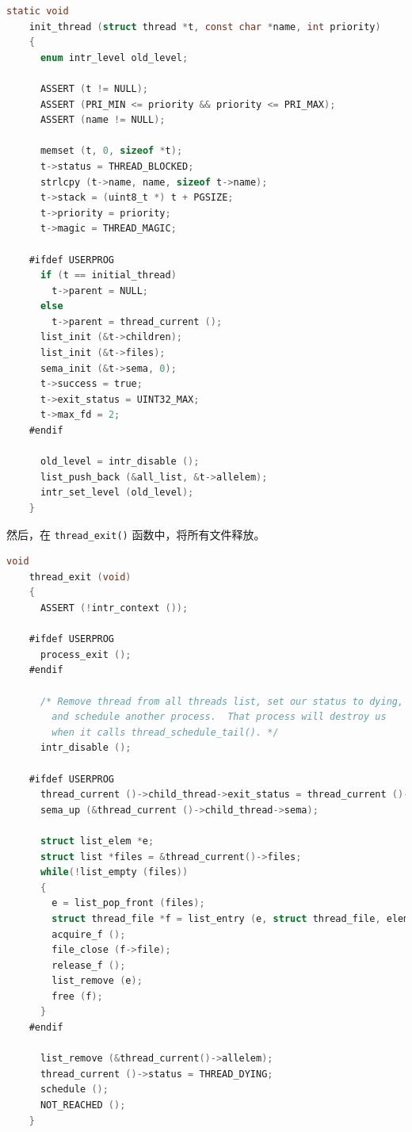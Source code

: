 \documentclass{article}
\begin{document}
\begin{lstlisting}[language=C, title=\texttt{src/threads/thread.c - init\_thread()}]
    static void
    init_thread (struct thread *t, const char *name, int priority)
    {
      enum intr_level old_level;
    
      ASSERT (t != NULL);
      ASSERT (PRI_MIN <= priority && priority <= PRI_MAX);
      ASSERT (name != NULL);
    
      memset (t, 0, sizeof *t);
      t->status = THREAD_BLOCKED;
      strlcpy (t->name, name, sizeof t->name);
      t->stack = (uint8_t *) t + PGSIZE;
      t->priority = priority;
      t->magic = THREAD_MAGIC;
    
    #ifdef USERPROG
      if (t == initial_thread)
        t->parent = NULL;
      else
        t->parent = thread_current ();
      list_init (&t->children);
      list_init (&t->files);
      sema_init (&t->sema, 0);
      t->success = true;
      t->exit_status = UINT32_MAX;
      t->max_fd = 2;
    #endif
    
      old_level = intr_disable ();
      list_push_back (&all_list, &t->allelem);
      intr_set_level (old_level);
    }
\end{lstlisting}

然后，在 \texttt{thread\_exit()} 函数中，将所有文件释放。

\begin{lstlisting}[language=C, title=\texttt{src/threads/thread.c - thread\_exit()}]
    void
    thread_exit (void) 
    {
      ASSERT (!intr_context ());
    
    #ifdef USERPROG
      process_exit ();
    #endif
    
      /* Remove thread from all threads list, set our status to dying,
        and schedule another process.  That process will destroy us
        when it calls thread_schedule_tail(). */
      intr_disable ();
    
    #ifdef USERPROG
      thread_current ()->child_thread->exit_status = thread_current ()->exit_status;
      sema_up (&thread_current ()->child_thread->sema);
    
      struct list_elem *e;
      struct list *files = &thread_current()->files;
      while(!list_empty (files))
      {
        e = list_pop_front (files);
        struct thread_file *f = list_entry (e, struct thread_file, elem);
        acquire_f ();
        file_close (f->file);
        release_f ();
        list_remove (e);
        free (f);
      }
    #endif
    
      list_remove (&thread_current()->allelem);
      thread_current ()->status = THREAD_DYING;
      schedule ();
      NOT_REACHED ();
    }
\end{lstlisting}
\end{document}
